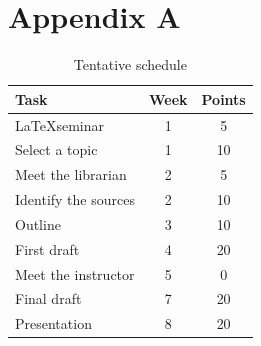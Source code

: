 \documentclass[11pt]{article}
\begin{document}
\printbibliography

\clearpage
\section*{Appendix A}

\begin{table}[!htbp]
    \centering
    \begin{tabular}{|l|c|c|}
        \hline
        Task                 & Week & Points \\
        \hline
        \LaTeX seminar       & 1    & 5      \\
        Select a topic       & 1    & 10     \\
        Meet the librarian   & 2    & 5      \\
        Identify the sources & 2    & 10     \\
        Outline              & 3    & 10     \\
        First draft          & 4    & 20     \\
        Meet the instructor  & 5    & 0      \\
        Final draft          & 7    & 20     \\
        Presentation         & 8    & 20     \\
        \hline
    \end{tabular}
    \caption{Tentative schedule}
    \label{tbl:schedule}
\end{table}
\end{document}
